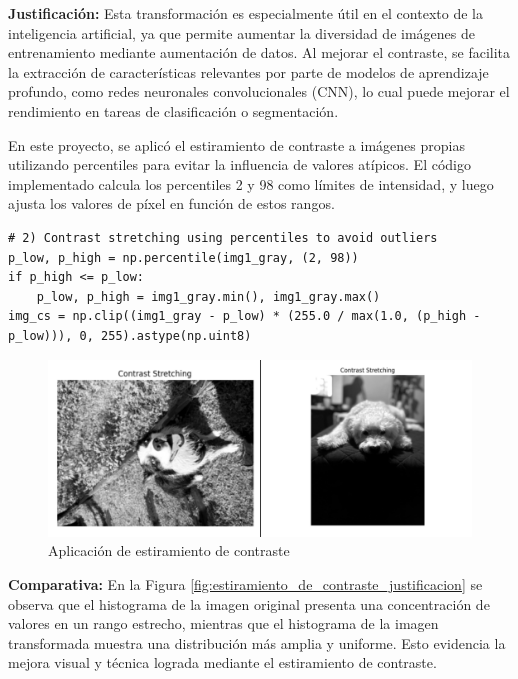 \documentclass[12pt,letterpaper]{article}
\begin{document}
\textbf{Justificación:} Esta transformación es especialmente útil en el contexto de la inteligencia artificial, ya que permite aumentar la diversidad de imágenes de entrenamiento mediante aumentación de datos. Al mejorar el contraste, se facilita la extracción de características relevantes por parte de modelos de aprendizaje profundo, como redes neuronales convolucionales (CNN), lo cual puede mejorar el rendimiento en tareas de clasificación o segmentación.

En este proyecto, se aplicó el estiramiento de contraste a imágenes propias utilizando percentiles para evitar la influencia de valores atípicos. El código implementado calcula los percentiles 2 y 98 como límites de intensidad, y luego ajusta los valores de píxel en función de estos rangos.

\begin{verbatim}
# 2) Contrast stretching using percentiles to avoid outliers
p_low, p_high = np.percentile(img1_gray, (2, 98))
if p_high <= p_low:
    p_low, p_high = img1_gray.min(), img1_gray.max()
img_cs = np.clip((img1_gray - p_low) * (255.0 / max(1.0, (p_high - p_low))), 0, 255).astype(np.uint8)
\end{verbatim}

\begin{figure}[H]
  \centering
  \includegraphics[width=0.8\linewidth]{figuras/estiramiento_de_contraste.png}
  \caption{Aplicación de estiramiento de contraste}
  \label{fig:estiramiento_de_contraste}
\end{figure}

\textbf{Comparativa:} En la Figura \ref{fig:estiramiento_de_contraste_justificacion} se observa que el histograma de la imagen original presenta una concentración de valores en un rango estrecho, mientras que el histograma de la imagen transformada muestra una distribución más amplia y uniforme. Esto evidencia la mejora visual y técnica lograda mediante el estiramiento de contraste.
\end{document}
